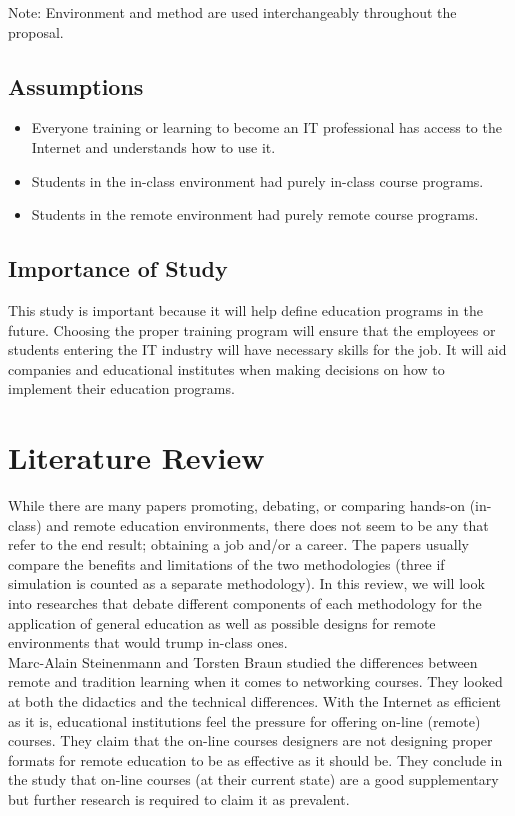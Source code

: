 \documentclass[titlepage]{article}
\begin{document}
Note: Environment and method are used interchangeably throughout the proposal.

\subsection{Assumptions}

\begin{itemize}
	\item Everyone training or learning to become an IT professional has access to the Internet
		  and understands how to use it.
	\item Students in the in-class environment had purely in-class course programs.
	\item Students in the remote environment had purely remote course programs.
\end{itemize}

\subsection{Importance of Study}
This study is important because it will help define education programs in the future.
Choosing the proper training program will ensure that the employees or students entering
the IT industry will have necessary skills for the job.  It will aid companies and
educational institutes when making decisions on how to implement their education programs.

\clearpage

\section{Literature Review}
While there are many papers promoting, debating, or comparing hands-on (in-class) and
remote education environments, there does not seem to be any that refer to the end result;
obtaining a job and/or a career.  The papers usually compare the benefits and limitations of
the two methodologies (three if simulation is counted as a separate methodology).  In this
review, we will look into researches that debate different components of each methodology
for the application of general education as well as possible designs for remote environments
that would trump in-class ones.\\

\noindent Marc-Alain Steinenmann and Torsten Braun \citep{1} studied the differences between remote and
tradition learning when it comes to networking courses.  They looked at both the didactics
and the technical differences.  With the Internet as efficient as it is, educational
institutions feel the pressure for offering on-line (remote) courses.  They claim that the
on-line courses designers are not designing proper formats for remote education to be as
effective as it should be.  They conclude in the study that on-line courses (at their current
state) are a good supplementary but further research is required to claim it as prevalent.\\
\end{document}
